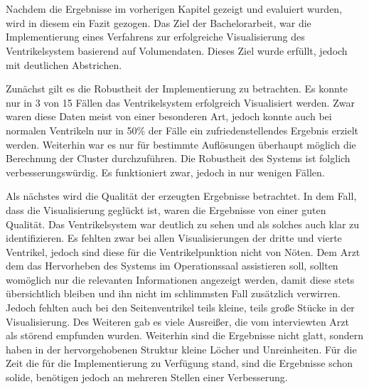 \chapter{}
\label{sec:discussion}


Nachdem die Ergebnisse im vorherigen Kapitel gezeigt und evaluiert wurden, wird in diesem ein Fazit gezogen.
\newline
Das Ziel der Bachelorarbeit, war die Implementierung eines Verfahrens zur erfolgreiche Visualisierung des Ventrikelsystem basierend auf Volumendaten. Dieses Ziel wurde erfüllt, jedoch mit deutlichen Abstrichen.


Zunächst gilt es die Robustheit der Implementierung zu betrachten. Es konnte nur in 3 von 15 Fällen das Ventrikelsystem erfolgreich Visualisiert werden. Zwar waren diese Daten meist von einer besonderen Art, jedoch konnte auch bei normalen Ventrikeln nur in 50\% der Fälle ein zufriedenstellendes Ergebnis erzielt werden. Weiterhin war es nur für bestimmte Auflösungen überhaupt möglich die Berechnung der Cluster durchzuführen.
\newline
Die Robustheit des Systems ist folglich verbesserungswürdig. Es funktioniert zwar, jedoch in nur wenigen Fällen.


Als nächstes wird die Qualität der erzeugten Ergebnisse betrachtet.
\newline
In dem Fall, dass die Visualisierung geglückt ist, waren die Ergebnisse von einer guten Qualität. Das Ventrikelsystem war deutlich zu sehen und als solches auch klar zu identifizieren. Es fehlten zwar bei allen Visualisierungen der dritte und vierte Ventrikel, jedoch sind diese für die Ventrikelpunktion nicht von Nöten. Dem Arzt dem das Hervorheben des Systems im Operationssaal assistieren soll, sollten womöglich nur die relevanten Informationen angezeigt werden, damit diese stets übersichtlich bleiben und ihn nicht im schlimmsten Fall zusätzlich verwirren.
\newline
Jedoch fehlten auch bei den Seitenventrikel teils kleine, teils große Stücke in der Visualisierung. Des Weiteren gab es viele Ausreißer, die vom interviewten Arzt als störend empfunden wurden. Weiterhin sind die Ergebnisse nicht glatt, sondern haben in der hervorgehobenen Struktur kleine Löcher und Unreinheiten.
\newline
Für die Zeit die für die Implementierung zu Verfügung stand, sind die Ergebnisse schon solide, benötigen jedoch an mehreren Stellen einer Verbesserung.


